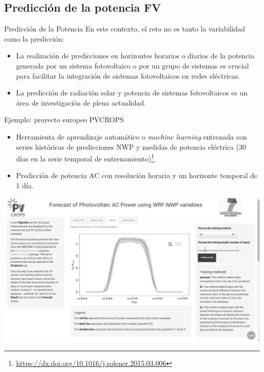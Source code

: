 \documentclass[aspectratio=169, usenames,svgnames,dvipsnames]{beamer}
\begin{document}
\subsection{Predicción de la potencia FV}
\label{sec:orgcfa97c0}
\begin{frame}[label={sec:org2f084df}]{Predicción de la Potencia}
En este contexto, el reto no es tanto la variabilidad como la
\alert{predicción}:

\begin{itemize}
\item La realización de \alert{predicciones en horizontes horarios o diarios} de
la potencia generada por un sistema fotovoltaico o por un grupo de
sistemas es \alert{crucial para facilitar la integración} de sistemas
fotovoltaicos en redes eléctricas.

\item La predicción de radiación solar y potencia de sistemas
fotovoltaicos es un \alert{área de investigación de plena actualidad}.
\end{itemize}
\end{frame}

\begin{frame}[label={sec:orgaf95315}]{Ejemplo: proyecto europeo PVCROPS}
\begin{itemize}
\item Herramienta de \alert{aprendizaje automático} o \emph{machine learning}
entrenada con \alert{series históricas} de \alert{predicciones NWP} y \alert{medidas de
potencia eléctrica} (30 días en la serie temporal de
entrenamiento)\footnote{\url{https://dx.doi.org/10.1016/j.solener.2015.03.006}}.
\item \alert{Predicción de potencia AC} con resolución \alert{horaria} y un horizonte
temporal de \alert{1 día}.
\end{itemize}


\begin{center}
\includegraphics[height=0.6\textheight]{../figs/ForecastShiny.png}
\end{center}
\end{frame}
\end{document}
